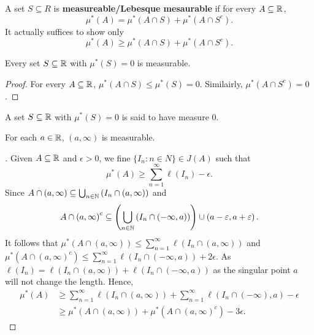 \begin{definition}[]
	A set \(S \subseteq R\) is \textbf{measureable/Lebesque mesaurable} if for every \( A \subseteq \mathbb{R}\), \[
		\mu^{*}\left( A \right)  = \mu^{*}\left( A \cap S \right)  + \mu^{*}\left( A \cap S^{c} \right)
	.\] It actually suffices to show only
	\[
		\mu^{*}\left( A \right)  \ge \mu^{*}\left( A \cap S \right)  + \mu^{*}\left( A \cap S^{c} \right)
	.\]
\end{definition}
\begin{proposition}
	Every set \(S \subseteq \mathbb{R}\) with \( \mu^{*}\left( S \right)  = 0\) is measurable.
\end{proposition}
\begin{proof}
	For every \(A \subseteq \mathbb{R}\), \( \mu^{*}\left( A \cap S \right)  \le \mu^{*}\left( S \right)  = 0\). Similairly, \( \mu^{*}\left( A \cap S^{c} \right) = 0\).
\end{proof}
\begin{definition}
	A set \(S \subseteq \mathbb{R}\) with \( \mu^{*}\left( S \right)  = 0\) is said to have measure \(0\).
\end{definition}
\begin{lemma}
	For each \(a \in \mathbb{R}\), \(\left( a, \infty \right) \) is measurable.
\end{lemma}
\begin{proof}[]
	Given \(A \subseteq \mathbb{R}\)	 and \(\epsilon > 0\), we fine \(\{I_{n} : n \in N\} \in J\left( A \right)  \) such that \[
		\mu^{*}\left( A \right) \ge \sum_{n=1}^{\infty}\ell\left( I_{n} \right)- \epsilon
	.\]
	Since \(A \cap \left( a, \infty \right) \subseteq \bigcup_{n \in \mathbb{N}}\left( I_{n} \cap \left( a, \infty \right)  \right)  \) and \[A \cap \left( a, \infty \right)^{c} \subseteq \left( \bigcup_{n \in \mathbb{N}} \left( I_{n} \cap \left( -\infty, a \right)  \right)   \right) \cup \left( a - \varepsilon, a + \varepsilon \right) . \]
	It follows that \( \mu^{*}\left( A\cap \left( a, \infty \right)  \right) \le \sum_{n=1}^{\infty}\ell\left( I_{n} \cap \left( a, \infty \right)  \right) \) and \( \mu^{*}\left( A \cap \left( a, \infty \right)^{c}  \right) \le \sum_{n=1}^{\infty} \ell\left( I_{n} \cap \left( -\infty, a \right)  \right) + 2\epsilon  \).
	As \(\ell \left( I_{n} \right) = \ell \left( I_{n} \cap \left( a, \infty \right)  \right) + \ell \left( I_{n} \cap \left( -\infty, a \right)  \right)   \) as the singular point \(a\) will not change the length. Hence, \begin{align*}
		\mu^{*}\left( A \right)  &\ge \sum_{n=1}^{\infty} \ell\left( I_{n} \cap \left( a, \infty \right)  \right)  + \sum_{n=1}^{\infty} \ell\left( I_{n} \cap \left( -\infty \right) , a \right) - \epsilon \\
					 &\ge \mu^{*}\left( A \cap \left( a, \infty \right)  \right) + \mu^{*}\left( A \cap \left( a, \infty \right)^{c}  \right) - 3\epsilon
	.\end{align*}
\end{proof}
